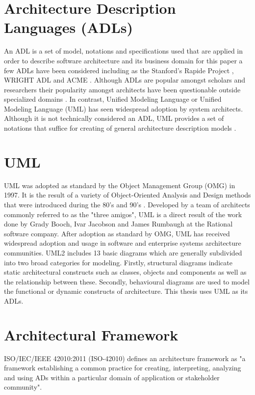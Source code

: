 \section{Architecture Description Languages (ADLs)}

An ADL is a set of model, notations and specifications used that are applied in order to describe software architecture and its business domain for this paper a few ADLs have been considered including as the Stanford's Rapide Project \cite{Luckham1996}, WRIGHT ADL \cite{Allen1997} and ACME \cite{bjorn}. Although ADLs are popular amongst scholars and researchers their popularity amongst architects have been questionable outside specialized domains \cite{Woods2005}. In contrast, Unified Modeling Language or Unified Modeling Language (UML) has seen widespread adoption by system architects. Although it is not technically considered an ADL, UML provides a set of notations that suffice for creating of general architecture description models \cite{Woods2005}.

\section{UML}

UML was adopted as standard by the Object Management Group (OMG) in 1997. It is the result of a variety of Object-Oriented Analysis and Design methods that were introduced during the 80's and 90's \cite{Fowler2004}. Developed by a team of architects commonly referred to as the "three amigos", UML is a direct result of the work done by Grady Booch, Ivar Jacobson and James Rumbaugh at the Rational software company. After adoption as standard by OMG, UML has received widespread adoption and usage in software and enterprise systems architecture communities. UML2 includes 13 basic diagrams which are generally subdivided into two broad categories for modeling. Firstly, structural diagrams indicate static architectural constructs such as classes, objects and components as well as the relationship between these. Secondly, behavioural diagrams are used to model the functional or dynamic constructs of architecture. This thesis uses UML as its ADLs.


\section{Architectural Framework}

ISO/IEC/IEEE 42010:2011 (ISO-42010) defines an architecture framework as "a framework establishing a common practice for creating, interpreting, analyzing and using ADs within a particular domain of application or stakeholder community".

